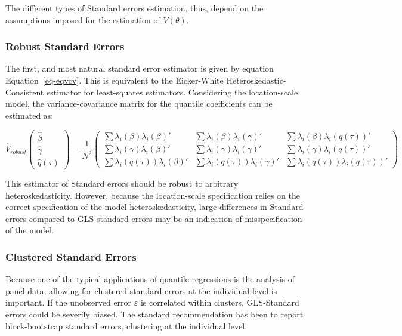 \documentclass[
  authoryear,
  review,
  1p]{elsarticle}
\begin{document}
The different types of Standard errors estimation, thus, depend on the
assumptions imposed for the estimation of \(V(\theta)\).

\subsubsection{Robust Standard Errors}\label{robust-standard-errors}

The first, and most natural standard error estimator is given by
equation Equation~\ref{eq-eqvcv}. This is equivalent to the Eicker-White
Heteroskedastic-Consistent estimator for least-squares estimators.
Considering the location-scale model, the variance-covariance matrix for
the quantile coefficients can be estimated as:

\[\hat{V}_{robust}
  \begin{pmatrix}
  \hat\beta \\
  \hat\gamma \\
  \hat q(\tau)
  \end{pmatrix}
 = \frac{1}{N^2} 
 \begin{pmatrix}
 \sum \lambda_i(\beta) \lambda_i(\beta)' & \sum \lambda_i(\beta) \lambda_i(\gamma)' & \sum \lambda_i(\beta) \lambda_i(q(\tau))' \\
 \sum \lambda_i(\gamma) \lambda_i(\beta)' & \sum \lambda_i(\gamma) \lambda_i(\gamma)' & \sum \lambda_i(\gamma) \lambda_i(q(\tau))' \\
 \sum \lambda_i(q(\tau)) \lambda_i(\beta)' & \sum \lambda_i(q(\tau))\lambda_i(\gamma)' & \sum \lambda_i(q(\tau)) \lambda_i(q(\tau))' 
  \end{pmatrix}
\]

This estimator of Standard errors should be robust to arbitrary
heteroskedasticity. However, because the location-scale specification
relies on the correct specification of the model heteroskedasticity,
large differences in Standard errors compared to GLS-standard errors may
be an indication of misspecification of the model.

\subsubsection{Clustered Standard
Errors}\label{clustered-standard-errors}

Because one of the typical applications of quantile regressions is the
analysis of panel data, allowing for clustered standard errors at the
individual level is important. If the unobserved error \(\varepsilon\)
is correlated within clusters, GLS-Standard errors could be severily
biased. The standard recommendation has been to report block-bootstrap
standard errors, clustering at the individual level.
\end{document}
